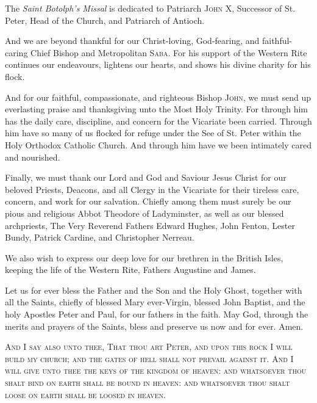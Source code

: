 {}
\noindent
The \emph{Saint Botolph's Missal} is dedicated to Patriarch \textsc{John X},  Successor of St. Peter, Head of the Church, and Patriarch of Antioch.\\
\par\noindent
And we are beyond thankful for our Christ-loving, God-fearing, and faithful-caring Chief Bishop and Metropolitan \textsc{Saba}. For his support of the Western Rite continues our endeavours, lightens our hearts, and shows his divine charity for his flock.\\
\par\noindent
And for our faithful, compassionate, and righteous Bishop \textsc{John}, we must send up everlasting praise and thanksgiving unto the Most Holy Trinity. For through him has the daily care, discipline, and concern for the Vicariate been carried. Through him have so many of us flocked for refuge under the See of St. Peter within the Holy Orthodox Catholic Church. And through him have we been intimately cared and nourished.\\
\par\noindent
Finally, we must thank our Lord and God and Saviour Jesus Christ for our beloved Priests, Deacons, and all Clergy in the Vicariate for their tireless care, concern, and work for our salvation. Chiefly among them must surely be our pious and religious Abbot Theodore of Ladyminster, as well as our blessed archpriests, The Very Reverend Fathers Edward Hughes, John Fenton, Lester Bundy, Patrick Cardine, and Christopher Nerreau.\\
\par\noindent
We also wish to express our deep love for our brethren in the British Isles, keeping the life of the Western Rite, Fathers Augustine and James.\\
\par\noindent
Let us for ever bless the Father and the Son and the Holy Ghost, together with all the Saints, chiefly of blessed Mary ever-Virgin, blessed John Baptist, and the holy Apostles Peter and Paul, for our fathers in the faith. May God, through the merits and prayers of the Saints, bless and preserve us now and for ever. Amen.
\vfill
\begin{center}
\textsc{And I say also unto thee, That thou art Peter, and upon this rock I will build my church; and the gates of hell shall not prevail against it. And I will give unto thee the keys of the kingdom of heaven: and whatsoever thou shalt bind on earth shall be bound in heaven: and whatsoever thou shalt loose on earth shall be loosed in heaven.}
\end{center}